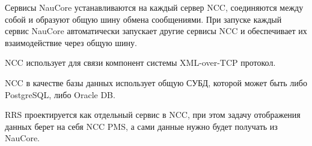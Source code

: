 Сервисы NauCore устанавливаются на каждый сервер NCC,
соединяются между собой и образуют общую шину обмена сообщениями.
При запуске каждый сервис NauCore автоматически запускает другие сервисы NCC
и обеспечивает их взаимодействие через общую шину.

NCC использует для связи компонент системы XML-over-TCP протокол.

NCC в качестве базы данных использует общую СУБД, которой может быть либо PostgreSQL, либо Oracle DB.

RRS проектируется как отдельный сервис в NCC,
при этом задачу отображения данных берет на себя NCC PMS,
а сами данные нужно будет получать из NauCore\cite{Pup09}. %
